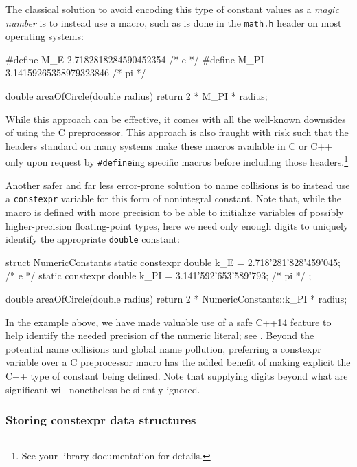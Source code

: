 The classical solution to avoid encoding this type of constant values as
a \emph{magic number} is to instead use a macro, such as is done in the
\lstinline!math.h! header on most operating systems:

\begin{emcppslisting}
#define M_E   2.7182818284590452354  /* e */
#define M_PI  3.14159265358979323846 /* pi */

double areaOfCircle(double radius)
{
    return 2 * M_PI * radius;
}
\end{emcppslisting}

\noindent While this approach can be effective, it comes with all the well-known
downsides of using the C preprocessor. This approach is also fraught
with risk such that the headers standard on many systems make these
macros available in C or C++ only upon request by \lstinline!#define!ing
specific macros before including those headers.\footnote{See your library
documentation for details.}

Another safer and far less error-prone solution to name collisions is to
instead use a \lstinline!constexpr! variable for this form of nonintegral
constant. Note that, while the macro is defined with more precision to
be able to initialize variables of possibly higher-precision
floating-point types, here we need only enough digits to uniquely
identify the appropriate \lstinline!double! constant:

\begin{emcppslisting}[emcppsstandards={c++14}]
struct NumericConstants
{
    static constexpr double k_E  = 2.718'281'828'459'045;  /* e */
    static constexpr double k_PI = 3.141'592'653'589'793;  /* pi */
};

double areaOfCircle(double radius)
{
    return 2 * NumericConstants::k_PI * radius;
}
\end{emcppslisting}

\noindent In the example above, we have made valuable use of a safe C++14
feature to help identify the needed precision of the numeric literal;
see . Beyond the potential name
collisions and global name pollution, preferring a constexpr variable
over a C preprocessor macro has the added benefit of making explicit the
C++ type of constant being defined. Note that supplying digits beyond
what are significant will nonetheless be silently ignored.

\subsubsection[Storing \lstinline!constexpr! data structures]{Storing {\SubsubsecCode constexpr} data structures}\label{storing-constexpr-data-structures}

